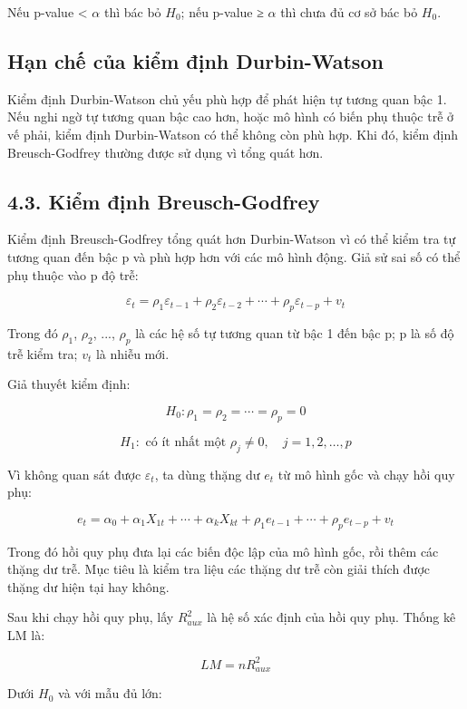 \documentclass[12pt,a4paper]{article}
\begin{document}
Nếu p-value < \(\alpha\) thì bác bỏ \(H_0\); nếu p-value ≥ \(\alpha\) thì chưa đủ cơ
sở bác bỏ \(H_0\).

\subsection{Hạn chế của kiểm định
Durbin-Watson}\label{hux1ea1n-chux1ebf-cux1ee7a-kiux1ec3m-ux111ux1ecbnh-durbin-watson}

Kiểm định Durbin-Watson chủ yếu phù hợp để phát hiện tự tương quan bậc
1. Nếu nghi ngờ tự tương quan bậc cao hơn, hoặc mô hình có biến phụ
thuộc trễ ở vế phải, kiểm định Durbin-Watson có thể không còn phù hợp.
Khi đó, kiểm định Breusch-Godfrey thường được sử dụng vì tổng quát hơn.

\subsection{4.3. Kiểm định
Breusch-Godfrey}\label{kiux1ec3m-ux111ux1ecbnh-breusch-godfrey}

Kiểm định Breusch-Godfrey tổng quát hơn Durbin-Watson vì có thể kiểm tra
tự tương quan đến bậc p và phù hợp hơn với các mô hình động. Giả sử sai
số có thể phụ thuộc vào p độ trễ:

\[
\varepsilon_t=\rho_1\varepsilon_{t-1}+\rho_2\varepsilon_{t-2}+\cdots+\rho_p\varepsilon_{t-p}+v_t
\]

Trong đó \(\rho_1\), \(\rho_2\), ..., \(\rho_p\) là các hệ số tự tương quan từ bậc 1 đến bậc p;
p là số độ trễ kiểm tra; \(v_t\) là nhiễu mới.

Giả thuyết kiểm định:

\[
H_0:\rho_1=\rho_2=\cdots=\rho_p=0
\]

\[
H_1:\text{ có ít nhất một }\rho_j\neq 0,\quad j=1,2,\ldots,p
\]

Vì không quan sát được \(\varepsilon_t\), ta dùng thặng dư \(e_t\) từ mô hình gốc và chạy
hồi quy phụ:

\[
e_t=\alpha_0+\alpha_1X_{1t}+\cdots+\alpha_kX_{kt}+\rho_1e_{t-1}+\cdots+\rho_pe_{t-p}+v_t
\]

Trong đó hồi quy phụ đưa lại các biến độc lập của mô hình gốc, rồi thêm
các thặng dư trễ. Mục tiêu là kiểm tra liệu các thặng dư trễ còn giải
thích được thặng dư hiện tại hay không.

Sau khi chạy hồi quy phụ, lấy \(R^2_{aux}\) là hệ số xác định của hồi quy phụ.
Thống kê LM là:

\[
LM=nR^2_{aux}
\]

Dưới \(H_0\) và với mẫu đủ lớn:
\end{document}
